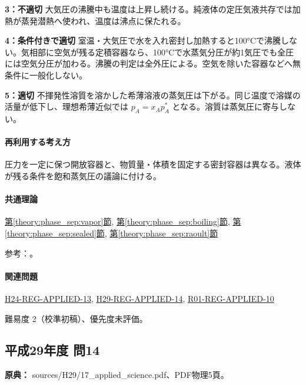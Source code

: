 \noindent\textbf{3：不適切} 大気圧の沸騰中も温度は上昇し続ける。純液体の定圧気液共存では加熱が蒸発潜熱へ使われ、温度は沸点に保たれる。\par

\noindent\textbf{4：条件付きで適切} 室温・大気圧で水を入れ密封し加熱すると100°Cで沸騰しない。気相部に空気が残る定積容器なら、100°Cで水蒸気分圧が約1気圧でも全圧には空気分圧が加わる。沸騰の判定は全外圧による。空気を除いた容器などへ無条件に一般化しない。\par

\noindent\textbf{5：適切} 不揮発性溶質を溶かした希薄溶液の蒸気圧は下がる。同じ温度で溶媒の活量が低下し、理想希薄近似では \(p_A=x_Ap_A^*\) となる。溶質は蒸気圧に寄与しない。\par

\paragraph{再利用する考え方} 圧力を一定に保つ開放容器と、物質量・体積を固定する密封容器は異なる。液体が残る条件を飽和蒸気圧の議論に付ける。

\paragraph{共通理論} \hyperref[theory:phase_sep:vapor]{第\ref*{theory:phase_sep:vapor}節}, \hyperref[theory:phase_sep:boiling]{第\ref*{theory:phase_sep:boiling}節}, \hyperref[theory:phase_sep:sealed]{第\ref*{theory:phase_sep:sealed}節}, \hyperref[theory:phase_sep:raoult]{第\ref*{theory:phase_sep:raoult}節}

\par 参考：\cite{mit_solutions2008,mit_clapeyron2008}。

\paragraph{関連問題} \hyperref[q:h24-reg-applied-13]{H24-REG-APPLIED-13}, \hyperref[q:h29-reg-applied-14]{H29-REG-APPLIED-14}, \hyperref[q:r01-reg-applied-10]{R01-REG-APPLIED-10}

\par 難易度 2（校準初稿）、優先度未評価。

\subsection{平成29年度 問14}
\label{q:h29-reg-applied-14}

\noindent\textbf{原典：} sources/H29/17\_applied\_science.pdf、PDF物理5頁。

